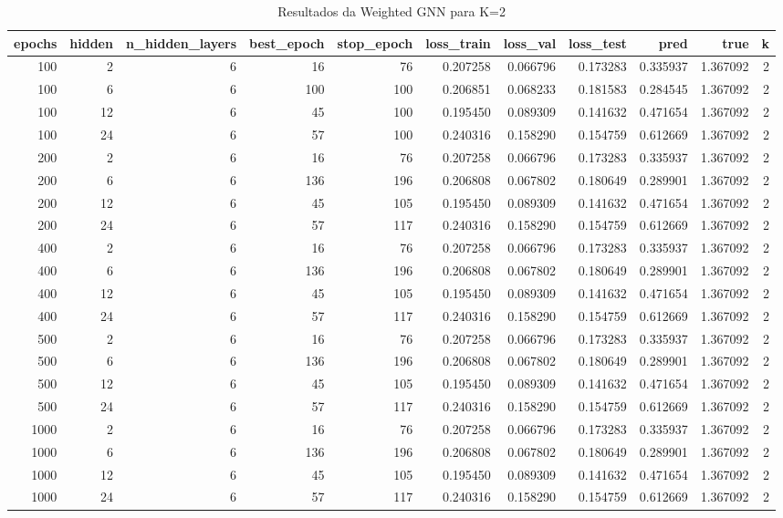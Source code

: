 \begin{table}
\caption{Resultados da Weighted GNN para K=2}
\label{tab:weighted_gnn_results_k2}
\begin{tabular}{rrrrrrrrrrr}
\toprule
epochs & hidden & n\_hidden\_layers & best\_epoch & stop\_epoch & loss\_train & loss\_val & loss\_test & pred & true & k \\
\midrule
100 & 2 & 6 & 16 & 76 & 0.207258 & 0.066796 & 0.173283 & 0.335937 & 1.367092 & 2 \\
100 & 6 & 6 & 100 & 100 & 0.206851 & 0.068233 & 0.181583 & 0.284545 & 1.367092 & 2 \\
100 & 12 & 6 & 45 & 100 & 0.195450 & 0.089309 & 0.141632 & 0.471654 & 1.367092 & 2 \\
100 & 24 & 6 & 57 & 100 & 0.240316 & 0.158290 & 0.154759 & 0.612669 & 1.367092 & 2 \\
200 & 2 & 6 & 16 & 76 & 0.207258 & 0.066796 & 0.173283 & 0.335937 & 1.367092 & 2 \\
200 & 6 & 6 & 136 & 196 & 0.206808 & 0.067802 & 0.180649 & 0.289901 & 1.367092 & 2 \\
200 & 12 & 6 & 45 & 105 & 0.195450 & 0.089309 & 0.141632 & 0.471654 & 1.367092 & 2 \\
200 & 24 & 6 & 57 & 117 & 0.240316 & 0.158290 & 0.154759 & 0.612669 & 1.367092 & 2 \\
400 & 2 & 6 & 16 & 76 & 0.207258 & 0.066796 & 0.173283 & 0.335937 & 1.367092 & 2 \\
400 & 6 & 6 & 136 & 196 & 0.206808 & 0.067802 & 0.180649 & 0.289901 & 1.367092 & 2 \\
400 & 12 & 6 & 45 & 105 & 0.195450 & 0.089309 & 0.141632 & 0.471654 & 1.367092 & 2 \\
400 & 24 & 6 & 57 & 117 & 0.240316 & 0.158290 & 0.154759 & 0.612669 & 1.367092 & 2 \\
500 & 2 & 6 & 16 & 76 & 0.207258 & 0.066796 & 0.173283 & 0.335937 & 1.367092 & 2 \\
500 & 6 & 6 & 136 & 196 & 0.206808 & 0.067802 & 0.180649 & 0.289901 & 1.367092 & 2 \\
500 & 12 & 6 & 45 & 105 & 0.195450 & 0.089309 & 0.141632 & 0.471654 & 1.367092 & 2 \\
500 & 24 & 6 & 57 & 117 & 0.240316 & 0.158290 & 0.154759 & 0.612669 & 1.367092 & 2 \\
1000 & 2 & 6 & 16 & 76 & 0.207258 & 0.066796 & 0.173283 & 0.335937 & 1.367092 & 2 \\
1000 & 6 & 6 & 136 & 196 & 0.206808 & 0.067802 & 0.180649 & 0.289901 & 1.367092 & 2 \\
1000 & 12 & 6 & 45 & 105 & 0.195450 & 0.089309 & 0.141632 & 0.471654 & 1.367092 & 2 \\
1000 & 24 & 6 & 57 & 117 & 0.240316 & 0.158290 & 0.154759 & 0.612669 & 1.367092 & 2 \\
\bottomrule
\end{tabular}
\end{table}
